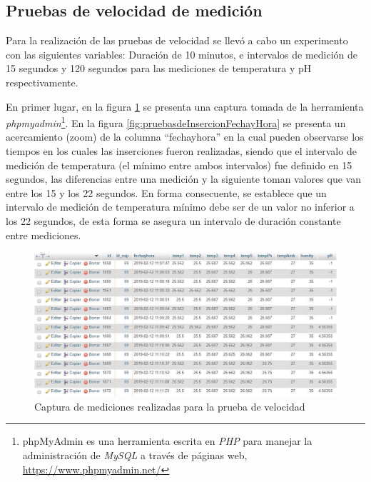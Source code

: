 \subsection{Pruebas de velocidad de medición}
\par
Para la realización de las pruebas de velocidad se llevó a cabo un experimento con las siguientes variables: Duración de 10 minutos, e intervalos de medición de 15 segundos y 120 segundos para las mediciones de temperatura y pH respectivamente.
\par 
En primer lugar, en la figura \ref{fig:pruebasdeInsercion} se presenta una captura tomada de la herramienta \textit{phpmyadmin}\footnote{phpMyAdmin es una herramienta escrita en \textit{PHP} para manejar la administración de \textit{MySQL} a través de páginas web, \url{https://www.phpmyadmin.net/}}. En la figura \ref{fig:pruebasdeInsercionFechayHora} se presenta un acercamiento (zoom) de la columna ``fechayhora'' en la cual  pueden observarse los tiempos en los cuales las inserciones fueron realizadas, siendo que el intervalo de medición de temperatura (el mínimo entre ambos intervalos) fue definido en 15 segundos, las diferencias entre una medición y la siguiente toman valores que van entre los 15 y los 22 segundos. En forma consecuente, se establece que un intervalo de medición de temperatura mínimo debe ser de un valor no inferior a los 22 segundos, de esta forma se asegura un intervalo de duración constante entre mediciones.
\begin{figure}[H]
    \centering
    \includegraphics[scale=0.5]{Pruebas/Inserciones.jpg}
    \caption{Captura de mediciones realizadas para la prueba de velocidad}
    \label{fig:pruebasdeInsercion}
\end{figure}
